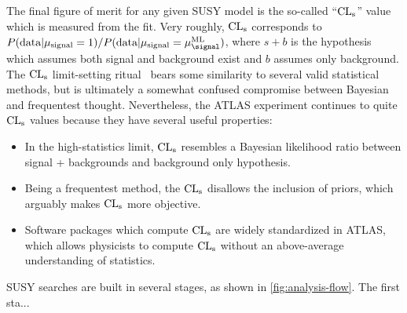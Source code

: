 The final figure of merit for any given SUSY model is the so-called ``$\mathrm{CL}_{\mathrm{s}}$'' value which is measured from the fit. Very roughly, $\mathrm{CL}_{\mathrm{s}}$ corresponds to $P(\text{data}| \mu_{\rm signal} = 1) / P(\text{data}| \mu_{\rm signal} = \mu_{\signal}^{\rm ML})$, where $s + b$ is the hypothesis which assumes both signal and background exist and $b$ assumes only background. The $\mathrm{CL}_{\mathrm{s}}$ limit-setting ritual~\cite{cls} bears some similarity to several valid statistical methods, but is ultimately a somewhat confused compromise between Bayesian and frequentest thought. Nevertheless, the ATLAS experiment continues to quite $\mathrm{CL}_{\mathrm{s}}$ values because they have several useful properties:
\begin{itemize}
\item In the high-statistics limit, $\mathrm{CL}_{\mathrm{s}}$ resembles a Bayesian likelihood ratio between signal + backgrounds and background only hypothesis.
\item Being a frequentest method, the $\mathrm{CL}_{\mathrm{s}}$ disallows the inclusion of priors, which arguably makes $\mathrm{CL}_{\mathrm{s}}$ more objective.
\item Software packages which compute $\mathrm{CL}_{\mathrm{s}}$ are widely standardized in ATLAS, which allows physicists to compute $\mathrm{CL}_{\mathrm{s}}$ without an above-average understanding of statistics.
\end{itemize}

SUSY searches are built in several stages, as shown in \cref{fig:analysis-flow}. The first sta...
